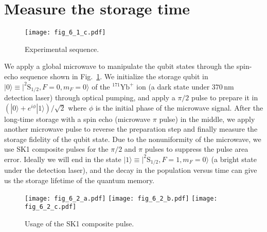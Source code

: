 \section{Measure the storage time}

\begin{figure}
    \centering
    \texttt{[image: fig\_6\_1\_c.pdf]}
    \caption{Experimental sequence.}
    \label{fig:6_1_c}
\end{figure}

We apply a global microwave to manipulate the qubit states through the spin-echo sequence shown in Fig.~\ref{fig:6_1_c}. We initialize the storage qubit in $|0\rangle \equiv |^{2}\mathrm{S}_{1/2},F=0,m_F=0\rangle$ of the $^{171}\mathrm{Yb}^+$ ion (a dark state under $370\,$nm detection laser) through optical pumping, and apply a $\pi/2$ pulse to prepare it in $(|0\rangle+e^{i\phi}|1\rangle)/\sqrt{2}$ where $\phi$ is the initial phase of the microwave signal. After the long-time storage with a spin echo (microwave $\pi$ pulse) in the middle, we apply another microwave pulse to reverse the preparation step and finally measure the storage fidelity of the qubit state. Due to the nonuniformity of the microwave, we use SK1 composite pulses for the $\pi/2$ and $\pi$ pulses to suppress the pulse area error. Ideally we will end in the state $|1\rangle \equiv |^{2}\mathrm{S}_{1/2},F=1,m_F=0\rangle$ (a bright state under the detection laser), and the decay in the population versus time can give us the storage lifetime of the quantum memory.

\begin{figure}
    \centering
    {\texttt{[image: fig\_6\_2\_a.pdf]}}
    {\texttt{[image: fig\_6\_2\_b.pdf]}}
    {\texttt{[image: fig\_6\_2\_c.pdf]}}
    \caption{Usage of the SK1 composite pulse.}
    \label{fig:6_2}
\end{figure}

